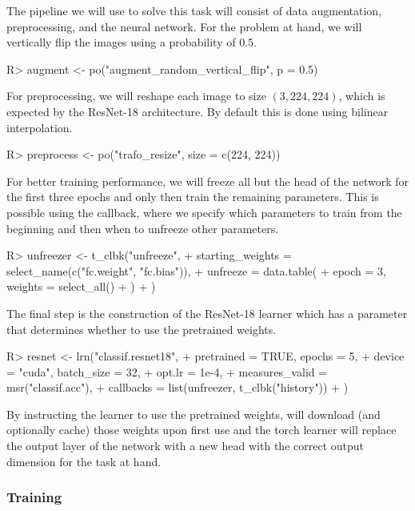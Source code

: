 \documentclass[article]{jss}
\theoremstyle{definition}
\begin{document}
The pipeline we will use to solve this task will consist of data augmentation, preprocessing, and the neural network.
For the problem at hand, we will vertically flip the images using a probability of $0.5$.

\begin{CodeInput}
R> augment <- po("augment_random_vertical_flip", p = 0.5)
\end{CodeInput}

For preprocessing, we will reshape each image to size $(3, 224, 224)$, which is expected by the ResNet-18 architecture.
By default this is done using bilinear interpolation.

\begin{CodeInput}
R> preprocess <- po("trafo_resize", size = c(224, 224))
\end{CodeInput}

For better training performance, we will freeze all but the head of the network for the first three epochs and only then train the remaining parameters.
This is possible using the  callback, where we specify which parameters to train from the beginning and then when to unfreeze other parameters.

\begin{CodeInput}
R> unfreezer <- t_clbk("unfreeze",
+    starting_weights = select_name(c("fc.weight", "fc.bias")),
+    unfreeze = data.table(
+      epoch = 3, weights = select_all()
+    )
+  )
\end{CodeInput}

The final step is the construction of the ResNet-18 learner which has a parameter  that determines whether to use the pretrained weights.

\begin{CodeInput}
R> resnet <- lrn("classif.resnet18",
+    pretrained = TRUE, epochs = 5,
+    device = "cuda", batch_size = 32,
+    opt.lr = 1e-4,
+    measures_valid = msr("classif.acc"),
+    callbacks = list(unfreezer, t_clbk("history"))
+  )
\end{CodeInput}

By instructing the learner to use the pretrained weights,  will download (and optionally cache) those weights upon first use and the torch learner will replace the output layer of the network with a new head with the correct output dimension for the task at hand.

\subsubsection{Training}
\end{document}
